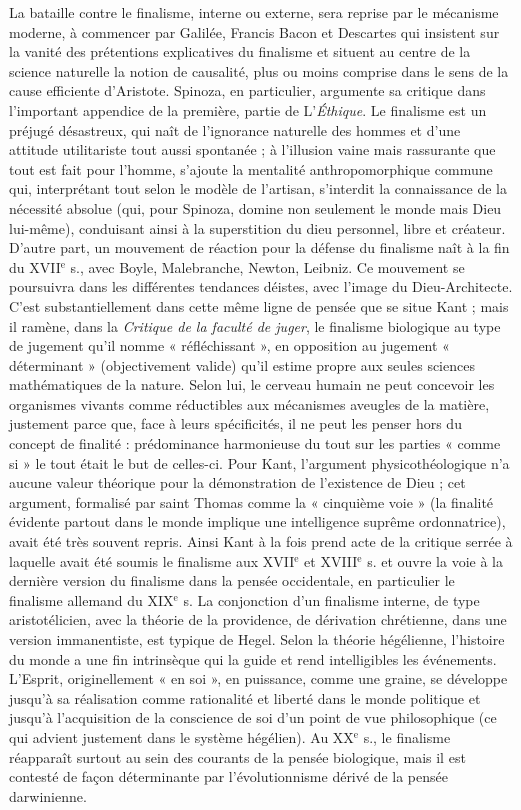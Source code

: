 La bataille contre le finalisme, interne
ou externe, sera reprise par le mécanisme
moderne, à commencer par Galilée, Francis Bacon et Descartes qui insistent sur la
vanité des prétentions explicatives du
finalisme et situent au centre de la science
naturelle la notion de causalité, plus ou
moins comprise dans le sens de la cause
efficiente d’Aristote. Spinoza, en particulier, argumente sa critique dans l’important appendice de la première, partie de
L'{\it Éthique}. Le finalisme est un préjugé
désastreux, qui naît de l’ignorance naturelle des hommes et d’une attitude utilitariste tout aussi spontanée ; à l’illusion
vaine mais rassurante que tout est fait
pour l’homme, s'ajoute la mentalité
anthropomorphique commune qui, interprétant tout selon le modèle de l'artisan,
s’interdit la connaissance de la nécessité
absolue (qui, pour Spinoza, domine non
seulement le monde mais Dieu lui-même), conduisant ainsi à la superstition
du dieu personnel, libre et créateur.
D'autre part, un mouvement de réaction
pour la défense du finalisme naît à la fin
du {\footnotesize XVII}$^\text{e}$ s., avec Boyle, Malebranche,
Newton, Leibniz. Ce mouvement se poursuivra dans les différentes tendances
déistes, avec l’image du Dieu-Architecte.
C’est substantiellement dans cette même
ligne de pensée que se situe Kant ; mais il
ramène, dans la {\it Critique de la faculté de
juger}, le finalisme biologique au type de
jugement qu’il nomme « réfléchissant »,
en opposition au jugement « déterminant » (objectivement valide) qu’il estime
propre aux seules sciences mathématiques
de la nature. Selon lui, le cerveau humain
ne peut concevoir les organismes vivants
comme  réductibles aux mécanismes
aveugles de la matière, justement parce
que, face à leurs spécificités, il ne peut les
penser hors du concept de finalité : prédominance harmonieuse du tout sur les parties « comme si » le tout était le but de
%
celles-ci. Pour Kant, l’argument physicothéologique n’a aucune valeur théorique
pour la démonstration de l’existence de
Dieu ; cet argument, formalisé par saint
Thomas comme la « cinquième voie » (la
finalité évidente partout dans le monde
implique une intelligence suprême ordonnatrice), avait été très souvent repris.
Ainsi Kant à la fois prend acte de la critique serrée à laquelle avait été soumis le
finalisme aux {\footnotesize XVII}$^\text{e}$ et {\footnotesize XVIII}$^\text{e}$ s. et ouvre la
voie à la dernière version du finalisme
dans la pensée occidentale, en particulier
le finalisme allemand du {\footnotesize XIX}$^\text{e}$ s. La
conjonction d’un finalisme interne, de
type aristotélicien, avec la théorie de la
providence, de dérivation chrétienne,
dans une version immanentiste, est
typique de Hegel. Selon la théorie hégélienne, l’histoire du monde a une fin
intrinsèque qui la guide et rend intelligibles les événements. L'Esprit, originellement « en soi », en puissance, comme
une graine, se développe jusqu’à sa réalisation comme rationalité et liberté dans le
monde politique et jusqu’à l'acquisition
de la conscience de soi d’un point de vue
philosophique (ce qui advient justement
dans le système hégélien). Au {\footnotesize XX}$^\text{e}$ s., le
finalisme réapparaît surtout au sein des
courants de la pensée biologique, mais il
est contesté de façon déterminante par
l’évolutionnisme dérivé de la pensée darwinienne.

